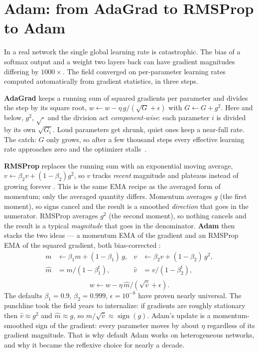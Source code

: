 \documentclass[10pt,conference]{IEEEtran}
\newcommand{\sign}{\operatorname{sign}}
\begin{document}
\section{Adam: from AdaGrad to RMSProp to Adam}
In a real network the single global learning rate is catastrophic. The bias of a
softmax output and a weight two layers back can have gradient magnitudes
differing by $1000\times$. The field converged on per-parameter learning rates
computed automatically from gradient statistics, in three steps.

\textbf{AdaGrad} keeps a running sum of squared gradients per parameter and
divides the step by its square root, $w \leftarrow w - \eta\, g/(\sqrt{G}+\epsilon)$
with $G \leftarrow G + g^2$. Here and below, $g^2$, $\sqrt{\cdot}$ and the
division act \emph{component-wise}: each parameter $i$ is divided by its own
$\sqrt{G_i}$. Loud parameters get shrunk, quiet ones keep a
near-full rate. The catch: $G$ only grows, so after a few thousand steps every
effective learning rate approaches zero and the optimizer stalls~\cite{ref1}.

\textbf{RMSProp} replaces the running sum with an exponential moving average,
$v \leftarrow \beta_2 v + (1-\beta_2) g^2$, so $v$ tracks \emph{recent} magnitude
and plateaus instead of growing forever \cite{ref2}. This is the same EMA recipe
as the averaged form of momentum; only the averaged quantity differs. Momentum
averages $g$ (the first moment), so signs cancel and the result is a smoothed
\emph{direction} that goes in the numerator. RMSProp averages $g^2$ (the second
moment), so nothing cancels and the result is a typical \emph{magnitude} that goes
in the denominator. \textbf{Adam} then stacks
the two ideas --- a momentum EMA of the gradient and an RMSProp EMA of the
squared gradient, both bias-corrected \cite{ref3}:
\begin{equation}
\begin{aligned}
m &\leftarrow \beta_1 m + (1-\beta_1)\, g, &
v &\leftarrow \beta_2 v + (1-\beta_2)\, g^2, \\
\hat m &= m/(1-\beta_1^t), &
\hat v &= v/(1-\beta_2^t), \\
\end{aligned}
\end{equation}
\begin{equation}
w \leftarrow w - \eta\, \hat m / (\sqrt{\hat v}+\epsilon).
\end{equation}
The defaults $\beta_1=0.9$, $\beta_2=0.999$, $\epsilon=10^{-8}$ have proven nearly
universal. The punchline took the field years to internalize: if gradients are
roughly stationary then $\hat v \approx g^2$ and $\hat m \approx g$, so
$\hat m/\sqrt{\hat v} \approx \sign(g)$. Adam's update is a momentum-smoothed sign
of the gradient: every parameter moves by about $\eta$ regardless of its gradient
magnitude. That is why default Adam works on heterogeneous networks, and why it
became the reflexive choice for nearly a decade.
\end{document}
